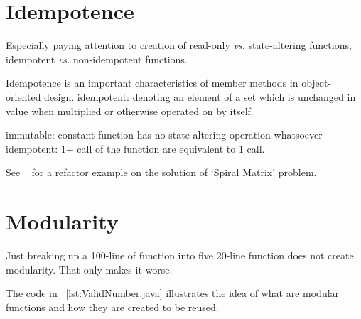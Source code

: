 %

\section{Idempotence}\label{sec:idempotence}

Especially paying attention to creation
of read-only  \textit{vs.} state-altering functions,
idempotent  \textit{vs.} non-idempotent functions.

Idempotence is an important characteristics of member methods in object-oriented design.
idempotent: denoting an element of a set which is unchanged in value when multiplied or otherwise operated on by itself.

immutable: constant function has no state altering operation whatsoever
idempotent: 1+ call of the function are equivalent to 1 call.

See ~ for a refactor example on the solution of `Spiral Matrix' problem.

\section{Modularity}

Just breaking up a 100-line of function into five 20-line function does not create modularity.
That only makes it worse.

The code in ~\autoref{lst:ValidNumber.java} illustrates the idea of what are modular functions and
how they are created to be reused.

\begin{clisting}
    
\end{clisting}

